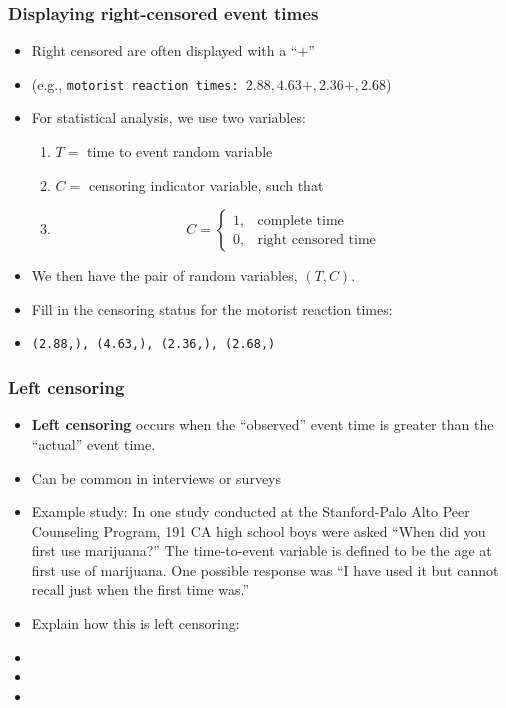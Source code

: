 \begin{frame}
\frametitle{Displaying right-censored event times}
\begin{itemize}
\item Right censored are often displayed with a ``$+$''
\item[] (e.g., \texttt{motorist reaction times:  $2.88, 4.63+, 2.36+, 2.68$})
\item For statistical analysis, we use two variables:
\begin{enumerate}
\item $T = $ time to event random variable
\item $C = $ censoring indicator variable, such that
\item[]
\[
    C =
\begin{cases}
    1, & \text{complete time}\\
    0, & \text{right censored time}
\end{cases}
\]
\end{enumerate}
\item We then have the pair of random variables, $(T,C)$.
\item Fill in the censoring status for the motorist reaction times:
\vskip5pt
\item[] \texttt{(2.88,\underline{\hspace{0.1in}}), (4.63,\underline{\hspace{0.1in}}), (2.36,\underline{\hspace{0.1in}}), (2.68,\underline{\hspace{0.1in}})}
\end{itemize}
\end{frame}

\begin{frame}
\frametitle{Left censoring}
\begin{itemize}
\item \textbf{Left censoring} occurs when the ``observed'' event time is greater than the ``actual'' event time.
\item Can be common in interviews or surveys
\item Example study: In one study conducted at the Stanford-Palo Alto Peer Counseling Program, 191 CA high school boys were asked ``When did you first use marijuana?'' The time-to-event variable is defined to be the age at first use of marijuana. One possible response was ``I have used it but cannot recall just when the first time was.''
\item Explain how this is left censoring:
\item[] %
\item[] %
\item[] %
\end{itemize}
\end{frame}


